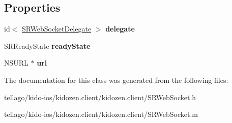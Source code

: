 \subsection*{Properties}
\begin{DoxyCompactItemize}
\item 
\hypertarget{interface_s_r_web_socket_a5b4d837b2b73b549b4daed53c580472c}{id$<$ \hyperlink{protocol_s_r_web_socket_delegate-p}{S\-R\-Web\-Socket\-Delegate} $>$ {\bfseries delegate}}\label{interface_s_r_web_socket_a5b4d837b2b73b549b4daed53c580472c}

\item 
\hypertarget{interface_s_r_web_socket_a76257bf57775f013d43cae26f1db2239}{S\-R\-Ready\-State {\bfseries ready\-State}}\label{interface_s_r_web_socket_a76257bf57775f013d43cae26f1db2239}

\item 
\hypertarget{interface_s_r_web_socket_a0e5a99e158db23739eb0b684f6a15ce2}{N\-S\-U\-R\-L $\ast$ {\bfseries url}}\label{interface_s_r_web_socket_a0e5a99e158db23739eb0b684f6a15ce2}

\end{DoxyCompactItemize}


The documentation for this class was generated from the following files\-:\begin{DoxyCompactItemize}
\item 
tellago/kido-\/ios/kidozen.\-client/kidozen.\-client/S\-R\-Web\-Socket.\-h\item 
tellago/kido-\/ios/kidozen.\-client/kidozen.\-client/S\-R\-Web\-Socket.\-m\end{DoxyCompactItemize}
